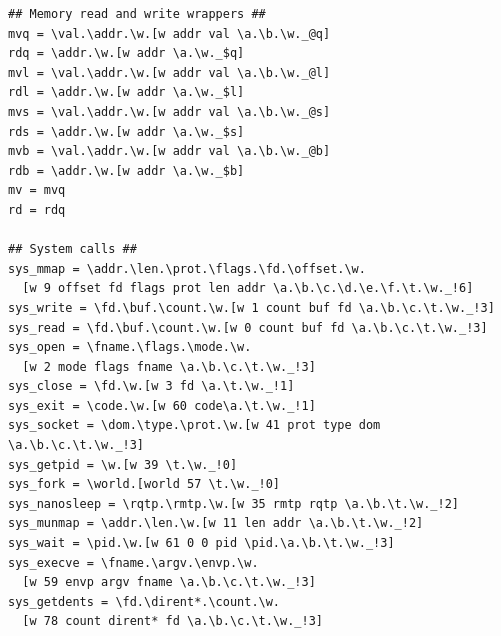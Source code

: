 \begin{verbatim}
## Memory read and write wrappers ##
mvq = \val.\addr.\w.[w addr val \a.\b.\w._@q]
rdq = \addr.\w.[w addr \a.\w._$q]
mvl = \val.\addr.\w.[w addr val \a.\b.\w._@l]
rdl = \addr.\w.[w addr \a.\w._$l]
mvs = \val.\addr.\w.[w addr val \a.\b.\w._@s]
rds = \addr.\w.[w addr \a.\w._$s]
mvb = \val.\addr.\w.[w addr val \a.\b.\w._@b]
rdb = \addr.\w.[w addr \a.\w._$b]
mv = mvq
rd = rdq

## System calls ##
sys_mmap = \addr.\len.\prot.\flags.\fd.\offset.\w.
  [w 9 offset fd flags prot len addr \a.\b.\c.\d.\e.\f.\t.\w._!6]
sys_write = \fd.\buf.\count.\w.[w 1 count buf fd \a.\b.\c.\t.\w._!3]
sys_read = \fd.\buf.\count.\w.[w 0 count buf fd \a.\b.\c.\t.\w._!3]
sys_open = \fname.\flags.\mode.\w.
  [w 2 mode flags fname \a.\b.\c.\t.\w._!3]
sys_close = \fd.\w.[w 3 fd \a.\t.\w._!1]
sys_exit = \code.\w.[w 60 code\a.\t.\w._!1]
sys_socket = \dom.\type.\prot.\w.[w 41 prot type dom \a.\b.\c.\t.\w._!3]
sys_getpid = \w.[w 39 \t.\w._!0]
sys_fork = \world.[world 57 \t.\w._!0]
sys_nanosleep = \rqtp.\rmtp.\w.[w 35 rmtp rqtp \a.\b.\t.\w._!2]
sys_munmap = \addr.\len.\w.[w 11 len addr \a.\b.\t.\w._!2]
sys_wait = \pid.\w.[w 61 0 0 pid \pid.\a.\b.\t.\w._!3]
sys_execve = \fname.\argv.\envp.\w.
  [w 59 envp argv fname \a.\b.\c.\t.\w._!3]
sys_getdents = \fd.\dirent*.\count.\w.
  [w 78 count dirent* fd \a.\b.\c.\t.\w._!3]


\end{verbatim}
